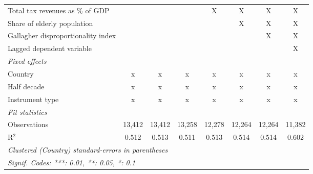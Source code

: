 \begin{table}[htbp]
\begin{tabular}{lccccccc}
      Total tax revenues as \% of GDP                                     &                &               &              & X            & X             & X             & X\\  
      Share of elderly population                                         &                &               &              &              & X             & X             & X\\  
      Gallagher disproportionality index                                  &                &               &              &              &               & X             & X\\  
      Lagged dependent variable                                           &                &               &              &              &               &               & X\\  
      \emph{Fixed effects}\\
      Country                                                             & x              & x             & x            & x            & x             & x             & x\\  
      Half decade                                                         & x              & x             & x            & x            & x             & x             & x\\  
      Instrument type                                                     & x              & x             & x            & x            & x             & x             & x\\  
      \midrule \emph{Fit statistics}\\
      Observations                                                        & 13,412         & 13,412        & 13,258       & 12,278       & 12,264        & 12,264        & 11,382\\  
      R$^2$                                                               & 0.512          & 0.513         & 0.511        & 0.513        & 0.514         & 0.514         & 0.602\\  
      \midrule
      \multicolumn{8}{l}{\emph{Clustered (Country) standard-errors in parentheses}}\\
      \multicolumn{8}{l}{\emph{Signif. Codes: ***: 0.01, **: 0.05, *: 0.1}}\\
   \end{tabular}
\end{table}


